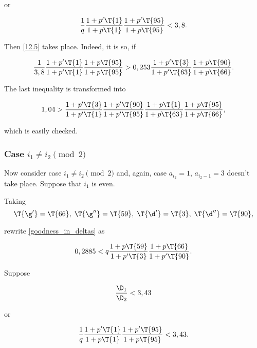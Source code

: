 or

\begin{equation*}
	\dfrac{1}{q}
	\dfrac{1 + p' \T{1}}{1 + p \T{1}}
	\dfrac{1 + p' \T{95}}{1 + p \T{95}}
	<
	3,8.
\end{equation*}

Then \ref{12.5} takes place. Indeed, it is so, if

\begin{equation*}
	\dfrac{1}{3,8}
	\dfrac{1 + p' \T{1}}{1 + p' \T{1}}
	\dfrac{1 + p \T{95}}{1 + p \T{95}}
	>
	0,253
	\dfrac{1 + p' \T{3}}{1 + p' \T{63}}
	\dfrac{1 + p \T{90}}{1 + p \T{66}}.
\end{equation*}

The last inequality is transformed into

\begin{equation*}
	1,04
	>
	\dfrac{1 + p' \T{3}}{1 + p' \T{1}}
	\dfrac{1 + p' \T{90}}{1 + p' \T{95}}
	\dfrac{1 + p \T{1}}{1 + p \T{63}}
	\dfrac{1 + p \T{95}}{1 + p \T{66}},
\end{equation*}

which is easily checked.

\subsubsection{Case $i_1 \ne i_2 \pmod 2$}

Now consider case $i_1 \ne i_2 \pmod 2$
and, again, case $a_{i_2} = 1$, $a_{i_2 - 1} = 3$
doesn't take place.
Suppose that $i_1$ is even.


Taking
\begin{equation*}
	\T{\g'} = \T{66},\;
	\T{\g''} = \T{59},\;
	\T{\d'} = \T{3},\;
	\T{\d''} = \T{90},
\end{equation*}

rewrite \ref{goodness_in_deltas} as

\begin{equation}\label{12.9}
	0,2885
	<
	q
	\dfrac{1 + p \T{59}}{1 + p' \T{3}}
	\dfrac{1 + p \T{66}}{1 + p' \T{90}}.
\end{equation}

Suppose

\begin{equation}\label{goodness_condition_3,43}
	\dfrac{\D_1}{\D_2} < 3,43
\end{equation}

or

\begin{equation*}
	\dfrac{1}{q}
	\dfrac{1 + p' \T{1}}{1 + p \T{1}}
	\dfrac{1 + p' \T{95}}{1 + p \T{95}}
	<
	3,43.
\end{equation*}

